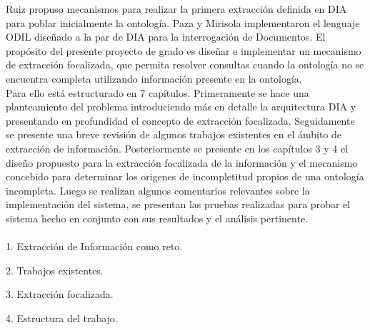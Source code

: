 Ruiz \cite{SemistructuredTextExtraction} \cite{ruiz-HMM} propuso mecanismos para realizar la primera extracción definida en DIA para poblar inicialmente la ontología. Paza y Mirisola \cite{ODILImplementation} implementaron el lenguaje ODIL diseñado a la par de DIA para la interrogación de Documentos. El propósito del presente proyecto de grado es diseñar e implementar un mecanismo de extracción focalizada, que permita resolver consultas cuando la ontología no se encuentra completa utilizando información presente en la ontología. \\

Para ello está estructurado en 7 capítulos. Primeramente se hace una planteamiento del problema introduciendo más en detalle la arquitectura DIA y presentando en profundidad el concepto de extracción focalizada. Seguidamente se presente una breve revisión de algunos trabajos existentes en el ámbito de extracción de información. Posteriormente se presente en los capítulos 3 y 4 el diseño propuesto para la extracción focalizada de la información y el mecanismo concebido para determinar los origenes de incompletitud propios de una ontología incompleta. Luego se realizan algunos comentarios relevantes sobre la implementación del sistema, se presentan las pruebas realizadas para probar el sistema hecho en conjunto con sus resultados y el análisis pertinente. \\

\\

1. Extracción de Información como reto.

2. Trabajos existentes.

3. Extracción focalizada.

4. Estructura del trabajo.
